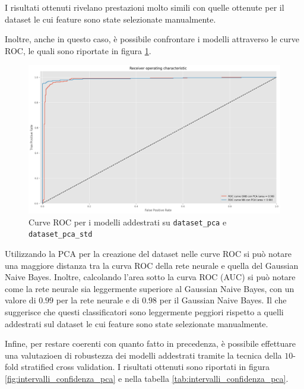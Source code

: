 I risultati ottenuti rivelano prestazioni molto simili con quelle ottenute per il
dataset le cui feature sono state selezionate manualmente.

Inoltre, anche in questo caso, è possibile confrontare i modelli attraverso le curve
ROC, le quali sono riportate in figura \ref{fig:roc_curve_pca}.
\begin{figure}[!ht]
    \centering
    \includegraphics[width=\textwidth]{img/ris/roc_curve_pca.png}
    \caption{Curve ROC per i modelli addestrati su \texttt{dataset\_pca} e \texttt{dataset\_pca\_std}}
    \label{fig:roc_curve_pca}
\end{figure}

Utilizzando la PCA per la creazione del dataset nelle curve ROC si può notare
una maggiore distanza tra la curva ROC della rete neurale e quella del Gaussian
Naive Bayes. Inoltre, calcolando l'area sotto la curva ROC (AUC) si può notare
come la rete neurale sia leggermente superiore al Gaussian Naive Bayes, con un
valore di $0.99$ per la rete neurale e di $0.98$ per il Gaussian Naive Bayes. Il
che suggerisce che questi classificatori sono leggermente peggiori rispetto a
quelli addestrati sul dataset le cui feature sono state selezionate manualmente.

Infine, per restare coerenti con quanto fatto in precedenza, è possibile effettuare
una valutazioen di robustezza dei modelli addestrati tramite la tecnica della 
$10$-fold stratified cross validation. 
I risultati ottenuti sono riportati in figura \ref{fig:intervalli_confidenza_pca}
e nella tabella \ref{tab:intervalli_confidenza_pca}.

